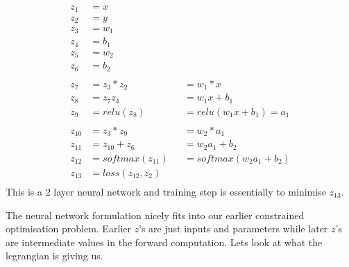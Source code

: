 \documentclass[10pt]{article}
\begin{document}
$$\begin{aligned}
z_{1} &= x\\
z_{2} &= y\\
z_{3} &= w_{1}\\
z_{4} &= b_{1}\\
z_{5} &= w_{2}\\
z_{6} &= b_{2}\\
\\
z_{7} &= z_{3}*z_{2} &&= w_{1}*x\\
z_{8} &= z_{7}z_{4} &&= w_{1}x+b_{1}\\
z_{9} &= relu(z_{8}) &&= relu(w_{1}x+b_{1})=a_{1}\\
\\
z_{10} &= z_{3}*z_{9} &&= w_{2}*a_{1}\\
z_{11} &= z_{10}+z_{6} &&= w_{2}a_{1}+b_{2}\\
z_{12} &= softmax(z_{11}) &&= softmax(w_{2}a_{1}+b_{2})\\
z_{13} &= loss(z_{12},z_{2})\\
\end{aligned}$$
This is  a 2 layer neural network and training step is essentially to minimise $z_{13}$.

The neural network formulation nicely fits into our earlier constrained optimisation problem. Earlier $z$'s are just inputs and parameters while later $z$'s are intermediate values in the forward computation. Lets look at what the legrangian is giving us.
\end{document}
